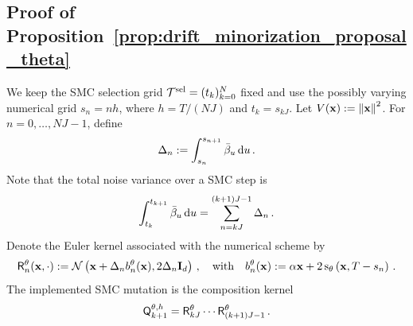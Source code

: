 \documentclass[11pt]{article}
\theoremstyle{plain}
\theoremstyle{definition}
\theoremstyle{remark}
\begin{document}
\subsection{Proof of Proposition~\ref{prop:drift_minorization_proposal_theta}}
\label{app:diffusion_specialization}

We keep the SMC selection grid $\mathcal{T}^{\rm sel}=(t_k)_{k=0}^N$ fixed and use the possibly varying numerical grid $s_n=nh$, where $h=T/(NJ)$ and $t_k=s_{kJ}$.
Let $V(\mathbf{x}):=\left\|\mathbf{x}\right\|^2$. For $n=0,\ldots,NJ-1$, define
$$
\Delta_n := \int_{s_n}^{s_{n+1}}\bar{\beta}_{u}\,\mathrm{d} u \,.
$$
Note that the total noise variance over a SMC step is 
$$
\int_{t_k}^{t_{k+1}}\bar{\beta}_{u}\,\mathrm{d} u = \sum_{n=kJ}^{(k+1)J-1}\Delta_n \,.
$$
%
Denote the Euler kernel associated with the numerical scheme by
$$
\mathsf R_n^\theta(\x,\cdot) \eqdef \gaussiand{ \x+\Delta_n b_n^\theta(\x) }{ 2\Delta_n\Id_\xdim } \eqsp, \quad \text{with} \quad b_n^\theta(\x) \eqdef \isvp \x + 2 \scorenet[T-s_n][\x][\theta] \eqsp.
$$
The implemented SMC mutation is the composition kernel
$$
\mk{k+1}[\theta,h] = \mathsf R_{kJ}^\theta \cdots \mathsf R_{(k+1)J-1}^\theta \eqsp.
$$
%
\end{document}
